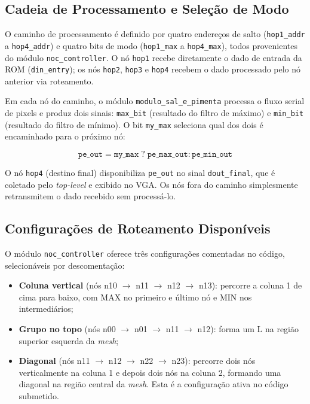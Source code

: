 \documentclass[12pt, a4paper]{article}
\begin{document}
	\subsection{Cadeia de Processamento e Seleção de Modo}
	
	O caminho de processamento é definido por quatro endereços de salto
	(\texttt{hop1\_addr} a \texttt{hop4\_addr}) e quatro bits de modo
	(\texttt{hop1\_max} a \texttt{hop4\_max}), todos provenientes do módulo
	\texttt{noc\_controller}. O nó \texttt{hop1} recebe diretamente o dado de
	entrada da ROM (\texttt{din\_entry}); os nós \texttt{hop2}, \texttt{hop3} e
	\texttt{hop4} recebem o dado processado pelo nó anterior via roteamento.
	
	Em cada nó do caminho, o módulo \texttt{modulo\_sal\_e\_pimenta} processa o
	fluxo serial de pixels e produz dois sinais: \texttt{max\_bit} (resultado do
	filtro de máximo) e \texttt{min\_bit} (resultado do filtro de mínimo). O bit
	\texttt{my\_max} seleciona qual dos dois é encaminhado para o próximo nó:
	
	\begin{equation}
		\texttt{pe\_out} = \texttt{my\_max} \;?\; \texttt{pe\_max\_out} : \texttt{pe\_min\_out}
		\label{eq:pe_out}
	\end{equation}
	
	O nó \texttt{hop4} (destino final) disponibiliza \texttt{pe\_out} no sinal
	\texttt{dout\_final}, que é coletado pelo \textit{top-level} e exibido no VGA.
	Os nós fora do caminho simplesmente retransmitem o dado recebido sem processá-lo.
	
	\subsection{Configurações de Roteamento Disponíveis}
	
	O módulo \texttt{noc\_controller} oferece três configurações comentadas no
	código, selecionáveis por descomentação:
	
	\begin{itemize}
		\item \textbf{Coluna vertical} (nós n10 $\to$ n11 $\to$ n12 $\to$ n13):
		percorre a coluna 1 de cima para baixo, com MAX no primeiro e último nó
		e MIN nos intermediários;
		\item \textbf{Grupo no topo} (nós n00 $\to$ n01 $\to$ n11 $\to$ n12):
		forma um L na região superior esquerda da \textit{mesh};
		\item \textbf{Diagonal} (nós n11 $\to$ n12 $\to$ n22 $\to$ n23):
		percorre dois nós verticalmente na coluna 1 e depois dois nós na coluna 2,
		formando uma diagonal na região central da \textit{mesh}. Esta é a
		configuração ativa no código submetido.
	\end{itemize}
	
\end{document}
